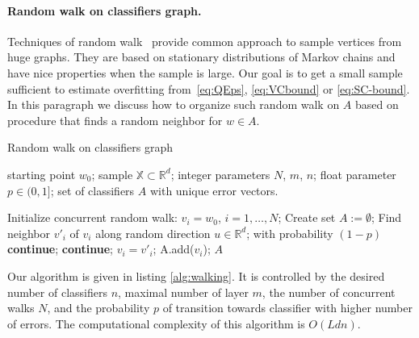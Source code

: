 \documentclass{article} %
\def\XX{\mathbb{X}}
\def\RR{\mathbb{R}}
\begin{document}
\paragraph{Random walk on classifiers graph.}
Techniques of random walk~\cite{avrachenkov10restarts, ribeiro10multidimensional, lee12backtrack}
provide common approach to sample vertices from huge graphs.
They are based on stationary distributions of Markov chains
and have nice properties when the sample is large.
Our goal is to get a small sample sufficient to estimate overfitting from~\eqref{eq:QEps},
\eqref{eq:VCbound} or \eqref{eq:SC-bound}.
In this paragraph we discuss how to organize such random walk on $A$
based on procedure that finds a random neighbor for $w \in A$.

\begin{algorithm}[t]
\caption{Random walk on classifiers graph}
\label{alg:walking}
\begin{algorithmic}[1]
\REQUIRE starting point $w_0$; sample $\XX \subset \RR^d$; integer parameters $N$, $m$, $n$; float parameter $p \in (0, 1]$;
\ENSURE set of classifiers $A$ with unique error vectors.

\STATE Initialize concurrent random walk: $v_i = w_0$, $i = 1, \dots, N$;
\STATE Create set $A := \emptyset$;
        \STATE Find neighbor $v'_i$ of $v_i$ along random direction $u \in \RR^d$;
        \IF{$n(v'_i, \XX) > n(v_i, \XX)$}
            \STATE with probability $(1 - p)$ \textbf{continue};
        \ELSIF{$n(v'_i, \XX) > n(w_0, \XX) + m$}
            \STATE \textbf{continue};
        \ENDIF
        \STATE $v_i = v'_i$;
        \STATE A.add($v_i$);
    \ENDFOR
\ENDWHILE
\RETURN $A$
\end{algorithmic}
\end{algorithm}

Our algorithm is given in listing \ref{alg:walking}.
It is controlled by the desired number of classifiers $n$,
maximal number of layer $m$,
the number of concurrent walks $N$,
and the probability $p$ of transition towards classifier with higher number of errors.
The computational complexity of this algorithm is $O(L d n)$.
\end{document}
